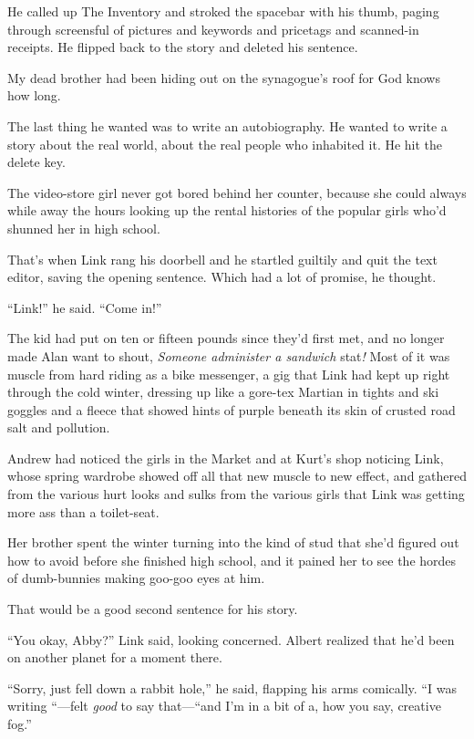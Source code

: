 He called up The Inventory and stroked the spacebar with his thumb,
paging through screensful of pictures and keywords and pricetags and
scanned-in receipts.  He flipped back to the story and deleted his
sentence.

My dead brother had been hiding out on the synagogue's roof for God
knows how long.

The last thing he wanted was to write an autobiography.  He wanted to
write a story about the real world, about the real people who
inhabited it.  He hit the delete key.

The video-store girl never got bored behind her counter, because she
could always while away the hours looking up the rental histories of
the popular girls who'd shunned her in high school.

That's when Link rang his doorbell and he startled guiltily and quit
the text editor, saving the opening sentence.  Which had a lot of
promise, he thought.

``Link!'' he said.  ``Come in!''

The kid had put on ten or fifteen pounds since they'd first met, and
no longer made Alan want to shout, \textit{Someone administer a
sandwich} stat\textit{!} Most of it was muscle from hard riding as a
bike messenger, a gig that Link had kept up right through the cold
winter, dressing up like a gore-tex Martian in tights and ski goggles
and a fleece that showed hints of purple beneath its skin of crusted
road salt and pollution.

Andrew had noticed the girls in the Market and at Kurt's shop noticing
Link, whose spring wardrobe showed off all that new muscle to new
effect, and gathered from the various hurt looks and sulks from the
various girls that Link was getting more ass than a toilet-seat.

Her brother spent the winter turning into the kind of stud that she'd
figured out how to avoid before she finished high school, and it
pained her to see the hordes of dumb-bunnies making goo-goo eyes at
him.

That would be a good second sentence for his story.

``You okay, Abby?'' Link said, looking concerned.  Albert realized
that he'd been on another planet for a moment there.

``Sorry, just fell down a rabbit hole,'' he said, flapping his arms
comically.  ``I was writing ``---felt \textit{good} to say that---``and
I'm in a bit of a, how you say, creative fog.''

